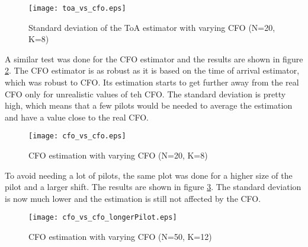\begin{figure}[H]
    \centering
    \texttt{[image: toa\_vs\_cfo.eps]}
    \caption{Standard deviation of the ToA estimator with varying CFO (N=20, K=8)}
    \label{fig:TOA_std_CFO}
\end{figure}

A similar test was done for the CFO estimator and the results are shown in figure \ref{fig:CFO_std_CFO}. The CFO estimator is as robust as it is based on the time of arrival estimator, which was robust to CFO. Its estimation starts to get further away from the real CFO only for unrealistic values of teh CFO. The standard deviation is pretty high, which means that a few pilots would be needed to average the estimation and have a value close to the real CFO. \par

\begin{figure}[H]
    \centering
    \texttt{[image: cfo\_vs\_cfo.eps]}
    \caption{CFO estimation with varying CFO (N=20, K=8)}
    \label{fig:CFO_std_CFO}
\end{figure}

To avoid needing a lot of pilots, the same plot was done for a higher size of the pilot and a larger shift. The results are shown in figure \ref{fig:CFO_std_CFO_N}. The standard deviation is now much lower and the estimation is still not affected by the CFO. \par

\begin{figure}[H]
    \centering
    \texttt{[image: cfo\_vs\_cfo\_longerPilot.eps]}
    \caption{CFO estimation with varying CFO (N=50, K=12)}
    \label{fig:CFO_std_CFO_N}
\end{figure}

